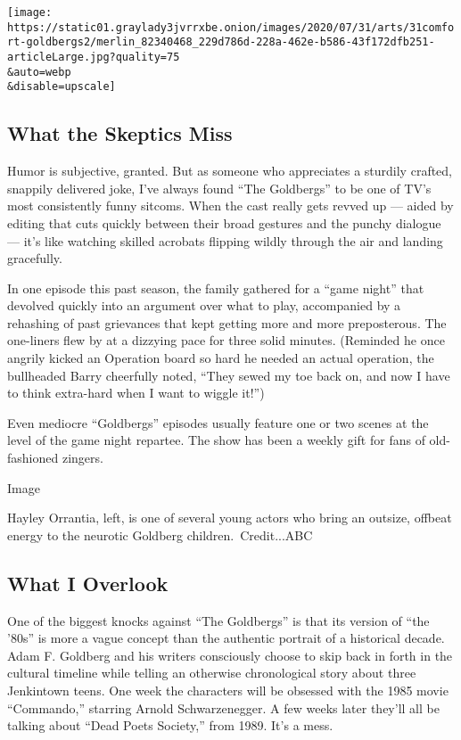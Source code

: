 \texttt{[image: https://static01.graylady3jvrrxbe.onion/images/2020/07/31/arts/31comfort-goldbergs2/merlin\_82340468\_229d786d-228a-462e-b586-43f172dfb251-articleLarge.jpg?quality=75\\\&auto=webp\\\&disable=upscale]}

\hypertarget{what-the-skeptics-miss}{%
\subsection{What the Skeptics Miss}\label{what-the-skeptics-miss}}

Humor is subjective, granted. But as someone who appreciates a sturdily
crafted, snappily delivered joke, I've always found ``The Goldbergs'' to
be one of TV's most consistently funny sitcoms. When the cast really
gets revved up --- aided by editing that cuts quickly between their
broad gestures and the punchy dialogue --- it's like watching skilled
acrobats flipping wildly through the air and landing gracefully.

In one episode this past season, the family gathered for a ``game
night'' that devolved quickly into an argument over what to play,
accompanied by a rehashing of past grievances that kept getting more and
more preposterous. The one-liners flew by at a dizzying pace for three
solid minutes. (Reminded he once angrily kicked an Operation board so
hard he needed an actual operation, the bullheaded Barry cheerfully
noted, ``They sewed my toe back on, and now I have to think extra-hard
when I want to wiggle it!'')

Even mediocre ``Goldbergs'' episodes usually feature one or two scenes
at the level of the game night repartee. The show has been a weekly gift
for fans of old-fashioned zingers.

Image

Hayley Orrantia, left, is one of several young actors who bring an
outsize, offbeat energy to the neurotic Goldberg children.~Credit...ABC

\hypertarget{what-i-overlook}{%
\subsection{What I Overlook}\label{what-i-overlook}}

One of the biggest knocks against ``The Goldbergs'' is that its version
of ``the '80s'' is more a vague concept than the authentic portrait of a
historical decade. Adam F. Goldberg and his writers consciously choose
to skip back in forth in the cultural timeline while telling an
otherwise chronological story about three Jenkintown teens. One week the
characters will be obsessed with the 1985 movie ``Commando,'' starring
Arnold Schwarzenegger. A few weeks later they'll all be talking about
``Dead Poets Society,'' from 1989. It's a mess.

